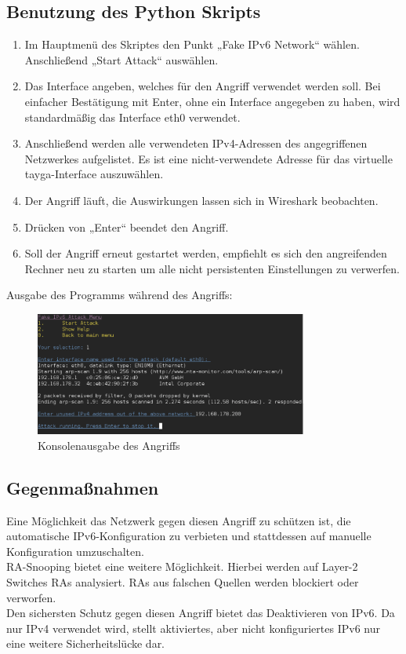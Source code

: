 \subsection*{Benutzung des Python Skripts}
\begin{enumerate}
	\item Im Hauptmenü des Skriptes den Punkt „Fake IPv6 Network“ wählen. Anschließend „Start Attack“ auswählen.
	\item Das Interface angeben, welches für den Angriff verwendet werden soll. Bei einfacher Bestätigung mit Enter, ohne ein Interface angegeben zu haben, wird standardmäßig das Interface eth0 verwendet.
	\item Anschließend werden alle verwendeten IPv4-Adressen des angegriffenen Netzwerkes aufgelistet. Es ist eine nicht-verwendete Adresse für das virtuelle tayga-Interface auszuwählen.
	\item Der Angriff läuft, die Auswirkungen lassen sich in Wireshark beobachten.
	\item Drücken von „Enter“ beendet den Angriff.
	\item Soll der Angriff erneut gestartet werden, empfiehlt es sich den angreifenden Rechner neu zu starten um alle nicht persistenten Einstellungen zu verwerfen.
\end{enumerate}
Ausgabe des Programms während des Angriffs:
\begin{figure}[h!]
	\centering
	\includegraphics[width=0.80\textwidth]{bilder/fakeIPv6/fakeIPv6menu.pdf}
	\caption{Konsolenausgabe des Angriffs}
	\label{fig:fakeIPv6menu}
\end{figure}


\subsection*{Gegenmaßnahmen}
Eine Möglichkeit das Netzwerk gegen diesen Angriff zu schützen ist, die automatische IPv6-Konfiguration zu verbieten und stattdessen auf manuelle Konfiguration umzuschalten. \\
RA-Snooping bietet eine weitere Möglichkeit. Hierbei werden auf Layer-2 Switches RAs analysiert. RAs aus falschen Quellen werden blockiert oder verworfen. \\
Den sichersten Schutz gegen diesen Angriff bietet das Deaktivieren von IPv6. Da nur IPv4 verwendet wird, stellt aktiviertes, aber nicht konfiguriertes IPv6 nur eine weitere Sicherheitslücke dar.
